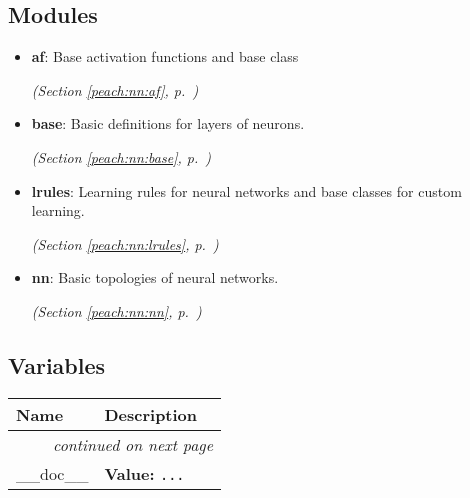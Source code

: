 \subsection{Modules}

\begin{itemize}
\setlength{\parskip}{0ex}
\item \textbf{af}: 
Base activation functions and base class


  \textit{(Section \ref{peach:nn:af}, p.~\pageref{peach:nn:af})}

\item \textbf{base}: 
Basic definitions for layers of neurons.


  \textit{(Section \ref{peach:nn:base}, p.~\pageref{peach:nn:base})}

\item \textbf{lrules}: 
Learning rules for neural networks and base classes for custom learning.


  \textit{(Section \ref{peach:nn:lrules}, p.~\pageref{peach:nn:lrules})}

\item \textbf{nn}: 
Basic topologies of neural networks.


  \textit{(Section \ref{peach:nn:nn}, p.~\pageref{peach:nn:nn})}

\end{itemize}



  \subsection{Variables}

\begin{longtable}{|p{}|p{}|l}
\cline{1-2}
\cline{1-2} \centering \textbf{Name} & \centering \textbf{Description}& \\
\cline{1-2}
\endhead\cline{1-2}\multicolumn{3}{r}{\small\textit{continued on next page}}\\\endfoot\cline{1-2}
\endlastfoot\raggedright \_\-\_\-d\-o\-c\-\_\-\_\- & \raggedright \textbf{Value:} 
{\tt \texttt{...}}&\\
\cline{1-2}
\end{longtable}

